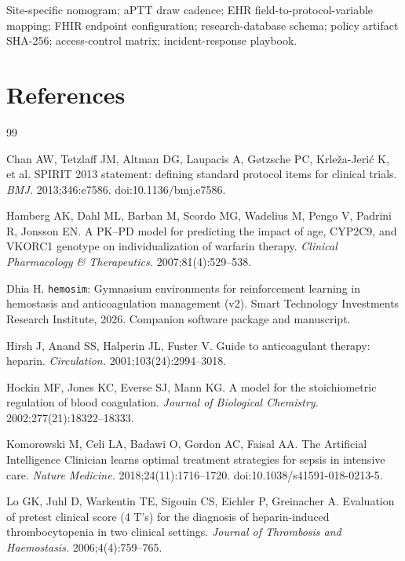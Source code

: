 \documentclass[11pt]{article}
\begin{document}
Site-specific nomogram; aPTT draw cadence; EHR field-to-protocol-variable mapping; FHIR endpoint configuration; research-database schema; policy artifact SHA-256; access-control matrix; incident-response playbook.

\section*{References}
\begin{thebibliography}{99}

Chan AW, Tetzlaff JM, Altman DG, Laupacis A, G{\o}tzsche PC, Krle\v{z}a-Jeri\'c K, et al.
SPIRIT 2013 statement: defining standard protocol items for clinical trials.
\emph{BMJ.} 2013;346:e7586. doi:10.1136/bmj.e7586.

Hamberg AK, Dahl ML, Barban M, Scordo MG, Wadelius M, Pengo V, Padrini R, Jonsson EN.
A PK--PD model for predicting the impact of age, CYP2C9, and VKORC1 genotype on individualization of warfarin therapy.
\emph{Clinical Pharmacology \& Therapeutics.} 2007;81(4):529--538.

Dhia H.
\texttt{hemosim}: Gymnasium environments for reinforcement learning in hemostasis and anticoagulation management (v2).
Smart Technology Investments Research Institute, 2026. Companion software package and manuscript.

Hirsh J, Anand SS, Halperin JL, Fuster V.
Guide to anticoagulant therapy: heparin.
\emph{Circulation.} 2001;103(24):2994--3018.

Hockin MF, Jones KC, Everse SJ, Mann KG.
A model for the stoichiometric regulation of blood coagulation.
\emph{Journal of Biological Chemistry.} 2002;277(21):18322--18333.

Komorowski M, Celi LA, Badawi O, Gordon AC, Faisal AA.
The Artificial Intelligence Clinician learns optimal treatment strategies for sepsis in intensive care.
\emph{Nature Medicine.} 2018;24(11):1716--1720. doi:10.1038/s41591-018-0213-5.

Lo GK, Juhl D, Warkentin TE, Sigouin CS, Eichler P, Greinacher A.
Evaluation of pretest clinical score (4 T's) for the diagnosis of heparin-induced thrombocytopenia in two clinical settings.
\emph{Journal of Thrombosis and Haemostasis.} 2006;4(4):759--765.


\end{thebibliography}
\end{document}
